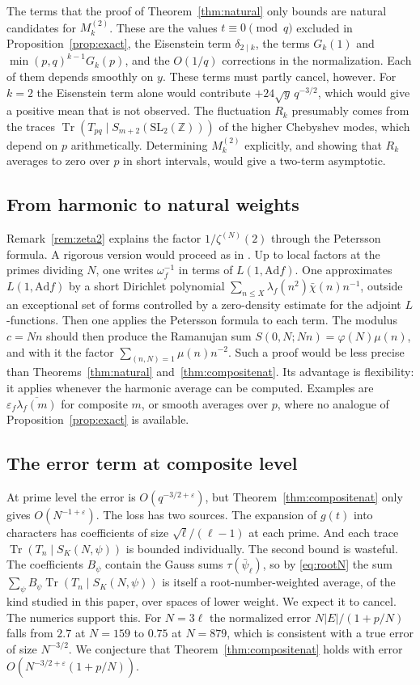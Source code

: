 \documentclass[11pt]{amsart}
\theoremstyle{remark}
\newcommand{\eps}{\varepsilon}
\newcommand{\ov}{\overline}
\newcommand{\Tr}{\operatorname{Tr}}
\newcommand{\SL}{\mathrm{SL}_2(\mathbb Z)}
\begin{document}
The terms that the proof of Theorem~\ref{thm:natural} only bounds are natural candidates for $M_k^{(2)}$. These are the values $t\equiv0\pmod q$ excluded in Proposition~\ref{prop:exact}, the Eisenstein term $\delta_{2\mid k}$, the terms $G_k(1)$ and $\min(p,q)^{k-1}G_k(p)$, and the $O(1/q)$ corrections in the normalization. Each of them depends smoothly on $y$. These terms must partly cancel, however. For $k=2$ the Eisenstein term alone would contribute $+24\sqrt y\,q^{-3/2}$, which would give a positive mean that is not observed. The fluctuation $R_k$ presumably comes from the traces $\Tr(T_{pq}\mid S_{m+2}(\SL))$ of the higher Chebyshev modes, which depend on $p$ arithmetically. Determining $M_k^{(2)}$ explicitly, and showing that $R_k$ averages to zero over $p$ in short intervals, would give a two-term asymptotic.

\subsection{From harmonic to natural weights}
Remark~\ref{rem:zeta2} explains the factor $1/\zeta^{(N)}(2)$ through the Petersson formula. A rigorous version would proceed as in \cite{ILS}. Up to local factors at the primes dividing $N$, one writes $\omega_f^{-1}$ in terms of $L(1,\mathrm{Ad}f)$. One approximates $L(1,\mathrm{Ad}f)$ by a short Dirichlet polynomial $\sum_{n\le X}\lambda_f(n^2)\bar\chi(n)n^{-1}$, outside an exceptional set of forms controlled by a zero-density estimate for the adjoint $L$-functions. Then one applies the Petersson formula to each term. The modulus $c=Nn$ should then produce the Ramanujan sum $S(0,N;Nn)=\varphi(N)\mu(n)$, and with it the factor $\sum_{(n,N)=1}\mu(n)n^{-2}$. Such a proof would be less precise than Theorems~\ref{thm:natural} and~\ref{thm:compositenat}. Its advantage is flexibility: it applies whenever the harmonic average can be computed. Examples are $\eps_f\ov{\lambda_f(m)}$ for composite $m$, or smooth averages over $p$, where no analogue of Proposition~\ref{prop:exact} is available.

\subsection{The error term at composite level}
At prime level the error is $O(q^{-3/2+\varepsilon})$, but Theorem~\ref{thm:compositenat} only gives $O(N^{-1+\varepsilon})$. The loss has two sources. The expansion of $g(t)$ into characters has coefficients of size $\sqrt\ell/(\ell-1)$ at each prime. And each trace $\Tr(T_n\mid S_K(N,\psi))$ is bounded individually. The second bound is wasteful. The coefficients $B_\psi$ contain the Gauss sums $\tau(\bar\psi_\ell)$, so by \eqref{eq:rootN} the sum $\sum_\psi B_\psi\Tr(T_n\mid S_K(N,\psi))$ is itself a root-number-weighted average, of the kind studied in this paper, over spaces of lower weight. We expect it to cancel. The numerics support this. For $N=3\ell$ the normalized error $N|E|/(1+p/N)$ falls from $2.7$ at $N=159$ to $0.75$ at $N=879$, which is consistent with a true error of size $N^{-3/2}$. We conjecture that Theorem~\ref{thm:compositenat} holds with error $O(N^{-3/2+\varepsilon}(1+p/N))$.
\end{document}
